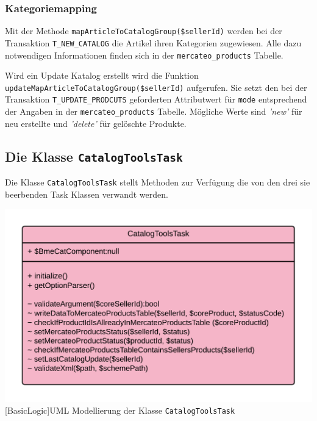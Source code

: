 	\subsubsection{Kategoriemapping}
	
	Mit der Methode \texttt{mapArticleToCatalogGroup(\$sellerId)} werden bei der Transaktion \texttt{T\_NEW\_CATALOG} die Artikel ihren Kategorien zugewiesen. Alle dazu notwendigen Informationen finden sich in der \texttt{mercateo\_products} Tabelle.
	
	Wird ein Update Katalog erstellt wird die Funktion \texttt{updateMapArticleToCatalogGroup(\$sellerId)} aufgerufen. Sie setzt den bei der Transaktion \texttt{T\_UPDATE\_PRODCUTS} geforderten Attributwert für \texttt{mode} entsprechend der Angaben in der \texttt{mercateo\_products} Tabelle.
	Mögliche Werte sind \textit{'new'} für neu erstellte und \textit{'delete'} für gelöschte Produkte.
	
	\subsection{Die Klasse \texttt{CatalogToolsTask}}
	
	Die Klasse \texttt{CatalogToolsTask} stellt Methoden zur Verfügung die von den drei sie beerbenden Task Klassen verwandt werden.
	
	\begin{minipage}{\linewidth}
		\vspace{0.5em}
		\centering
		\includegraphics[width=0.7 \linewidth]{img/CatalogToolsTaskUML}
		[BasicLogic]{UML Modellierung der Klasse \texttt{CatalogToolsTask}}
		\vspace{0.5em}
	\end{minipage}
	
